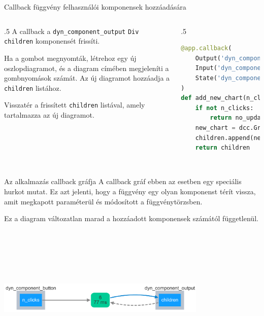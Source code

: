 \documentclass[english, aspectratio=169]{beamer}
\begin{document}
	\begin{frame}[fragile]{Callback függvény felhasználói komponensek hozzáadására}
		\begin{columns}
			\begin{column}{.5\textwidth}
				A callback a \texttt{dyn\_component\_output} \texttt{Div} \texttt{children} komponensét frissíti.\par\medskip
				Ha a gombot megnyomták, létrehoz egy új oszlopdiagramot, és a diagram címében megjeleníti a gombnyomások számát.
				Az új diagramot hozzáadja a \texttt{children} listához.\par\medskip
				Visszatér a frissített \texttt{children} listával, amely tartalmazza az új diagramot.
			\end{column}
			\begin{column}{.5\textwidth}
				\begin{lstlisting}[language=python]
@app.callback(
	Output('dyn_component_output', 'children'),
	Input('dyn_component_button', 'n_clicks'),
	State('dyn_component_output', 'children')
)
def add_new_chart(n_clicks, children):
	if not n_clicks:
		return no_update
	new_chart = dcc.Graph(figure=px.bar(title=f"Diagram {n_clicks}"))
	children.append(new_chart)
	return children
	
				\end{lstlisting}
			\end{column}
		\end{columns}
	\end{frame}
	
	\begin{frame}{Az alkalmazás callback gráfja}
		A callback gráf ebben az esetben egy speciális hurkot mutat. Ez azt jelenti, hogy a függvény egy olyan komponenst térít vissza, amit megkapott paraméterül és módosított a függvénytörzsben.\par\smallskip
		Ez a diagram változatlan marad a hozzáadott komponensek számától függetlenül.
		\vspace{1cm}
		\begin{center}
			\includegraphics[width=10cm, height=7cm, keepaspectratio]{images/adv_2.png}
		\end{center}
	\end{frame}
	
\end{document}
